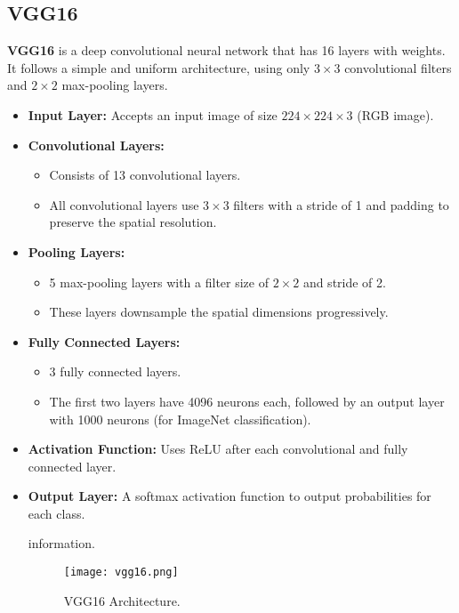 \documentclass{article}
\begin{document}
\subsection{VGG16}
\textbf{VGG16} is a deep convolutional neural network that has 16 layers with weights. It follows a simple and uniform architecture, using only $3\times3$ convolutional filters and $2\times2$ max-pooling layers.
\begin{itemize}
    \item \textbf{Input Layer:} Accepts an input image of size $224\times224\times3$ (RGB image).
    \item \textbf{Convolutional Layers:} 
    \begin{itemize}
        \item Consists of 13 convolutional layers.
        \item All convolutional layers use $3\times3$ filters with a stride of 1 and padding to preserve the spatial resolution.
    \end{itemize}
    \item \textbf{Pooling Layers:} 
    \begin{itemize}
        \item 5 max-pooling layers with a filter size of $2\times2$ and stride of 2.
        \item These layers downsample the spatial dimensions progressively.
    \end{itemize}
    \item \textbf{Fully Connected Layers:}
    \begin{itemize}
        \item 3 fully connected layers.
        \item The first two layers have 4096 neurons each, followed by an output layer with 1000 neurons (for ImageNet classification).
    \end{itemize}
    \item \textbf{Activation Function:} Uses ReLU after each convolutional and fully connected layer.
    \item \textbf{Output Layer:} A softmax activation function to output probabilities for each class.

    information.  \begin{figure}[H]
    \centering
    \texttt{[image: vgg16.png]}
    \caption{VGG16 Architecture.}
    \label{fig:conv_layer}
\end{figure}

\end{itemize}
\end{document}

